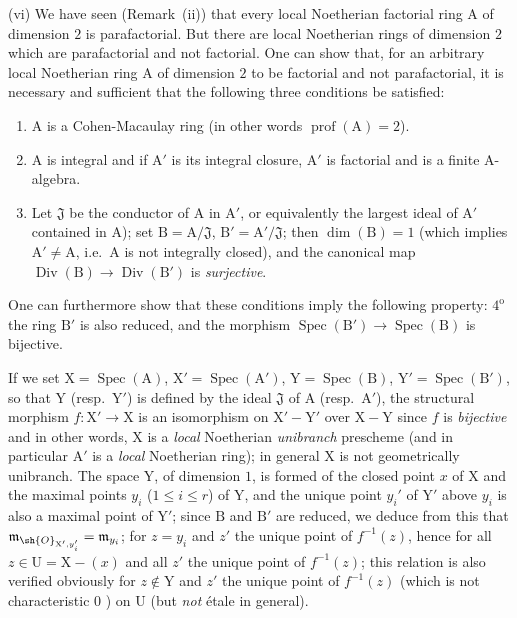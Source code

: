 \begin{env}[21.13.9]
(vi) We have seen (Remark~(ii)) that every local Noetherian factorial ring $\mathrm{A}$ of dimension $2$ is parafactorial.
But there are local Noetherian rings of dimension $2$ which are parafactorial and not factorial.
One can show that, for an arbitrary local Noetherian ring $\mathrm{A}$ of dimension $2$ to be factorial and not parafactorial, it is necessary and sufficient that the following three conditions be satisfied:
\begin{enumerate}[label=\arabic*\textsuperscript{o}]
  \item $\mathrm{A}$ is a Cohen-Macaulay ring (in other words $\operatorname{prof}(\mathrm{A})=2$).
  \item $\mathrm{A}$ is integral and if $\mathrm{A}'$ is its integral closure, $\mathrm{A}'$ is factorial and is a finite A-algebra.
  \item Let $\mathfrak{J}$ be the conductor of $\mathrm{A}$ in $\mathrm{A}'$, or equivalently the largest ideal of $\mathrm{A}'$ contained in $\mathrm{A}$); set $\mathrm{B}=\mathrm{A}/\mathfrak{J}$, $\mathrm{B}'=\mathrm{A}'/\mathfrak{J}$; then $\dim(\mathrm{B})=1$ (which implies $\mathrm{A}'\neq\mathrm{A}$, i.e.\ $\mathrm{A}$ is not integrally closed), and the canonical map $\operatorname{Div}(\mathrm{B})\to\operatorname{Div}(\mathrm{B}')$  is \emph{surjective}.
\end{enumerate}
One can furthermore show that these conditions imply the following property: $4^{\mathrm{o}}$ the ring $\mathrm{B}'$ is also reduced, and the morphism $\operatorname{Spec}(\mathrm{B}')\to\operatorname{Spec}(\mathrm{B})$ is bijective.

If we set $\mathrm{X}=\operatorname{Spec}(\mathrm{A})$, $\mathrm{X}'=\operatorname{Spec}(\mathrm{A}')$, $\mathrm{Y}=\operatorname{Spec}(\mathrm{B})$, $\mathrm{Y}'=\operatorname{Spec}(\mathrm{B}')$, so that $\mathrm{Y}$ (resp.\ $\mathrm{Y}'$) is defined by the ideal $\mathfrak{J}$ of $\mathrm{A}$ (resp.\ $\mathrm{A}'$), the structural morphism $f:\mathrm{X}'\to\mathrm{X}$ is an isomorphism on $\mathrm{X}'-\mathrm{Y}'$ over $\mathrm{X}-\mathrm{Y}$ since $f$ is \emph{bijective} and in other words, $\mathrm{X}$ is a \emph{local} Noetherian \emph{unibranch} prescheme (and in particular $\mathrm{A}'$ is a \emph{local} Noetherian ring); in general $\mathrm{X}$ is not geometrically unibranch.
The space $\mathrm{Y}$, of dimension $1$, is formed of the closed point $x$ of $\mathrm{X}$ and the maximal points $y_i$ ($1\leq i\leq r$) of $\mathrm{Y}$, and the unique point $y_i'$ of $\mathrm{Y}'$ above $y_i$ is also a maximal point of $\mathrm{Y}'$; since $\mathrm{B}$ and $\mathrm{B}'$ are reduced, we deduce from this that $\mathfrak{m}_{\sh{O}_{\mathrm{X}',y_i'}}=\mathfrak{m}_{y_i}$; for $z=y_i$ and $z'$ the unique point of $f^{-1}(z)$, hence for all $z\in\mathrm{U}=\mathrm{X}-(x)$ and all $z'$ the unique point of $f^{-1}(z)$; this relation is also verified obviously for $z\notin\mathrm{Y}$ and $z'$ the unique point of $f^{-1}(z)$ (which is not characteristic $0$ ) on $\mathrm{U}$ (but \emph{not} \'etale in general).
\end{env}

